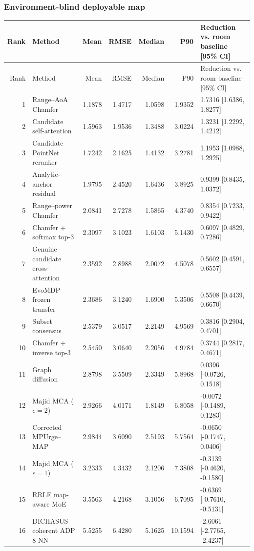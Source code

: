 \subsubsection{Environment-blind deployable map}
\begingroup\scriptsize\setlength{\tabcolsep}{3.2pt}
\begin{longtable}{@{}r p{.28\linewidth} r r r r p{.23\linewidth}@{}}
\toprule Rank & Method & Mean & RMSE & Median & P90 & Reduction vs. room baseline [95\% CI] \\
\midrule\endfirsthead
\toprule Rank & Method & Mean & RMSE & Median & P90 & Reduction vs. room baseline [95\% CI] \\
\midrule\endhead
1 & Range--AoA Chamfer & 1.1878 & 1.4717 & 1.0598 & 1.9352 & 1.7316 [1.6386, 1.8277] \\
2 & Candidate self-attention & 1.5963 & 1.9536 & 1.3488 & 3.0224 & 1.3231 [1.2292, 1.4212] \\
3 & Candidate PointNet reranker & 1.7242 & 2.1625 & 1.4132 & 3.2781 & 1.1953 [1.0988, 1.2925] \\
4 & Analytic-anchor residual & 1.9795 & 2.4520 & 1.6436 & 3.8925 & 0.9399 [0.8435, 1.0372] \\
5 & Range--power Chamfer & 2.0841 & 2.7278 & 1.5865 & 4.3740 & 0.8354 [0.7233, 0.9422] \\
6 & Chamfer + softmax top-3 & 2.3097 & 3.1023 & 1.6103 & 5.1430 & 0.6097 [0.4829, 0.7286] \\
7 & Genuine candidate cross-attention & 2.3592 & 2.8988 & 2.0072 & 4.5078 & 0.5602 [0.4591, 0.6557] \\
8 & EvoMDP frozen transfer & 2.3686 & 3.1240 & 1.6900 & 5.3506 & 0.5508 [0.4439, 0.6670] \\
9 & Subset consensus & 2.5379 & 3.0517 & 2.2149 & 4.9569 & 0.3816 [0.2904, 0.4701] \\
10 & Chamfer + inverse top-3 & 2.5450 & 3.0640 & 2.2056 & 4.9784 & 0.3744 [0.2817, 0.4671] \\
11 & Graph diffusion & 2.8798 & 3.5509 & 2.3349 & 5.8968 & 0.0396 [-0.0726, 0.1518] \\
12 & Majid MCA ($\epsilon=2$) & 2.9266 & 4.0171 & 1.8149 & 6.8058 & -0.0072 [-0.1489, 0.1283] \\
13 & Corrected MPUrge--MAP & 2.9844 & 3.6090 & 2.5193 & 5.7564 & -0.0650 [-0.1747, 0.0406] \\
14 & Majid MCA ($\epsilon=1$) & 3.2333 & 4.3432 & 2.1206 & 7.3808 & -0.3139 [-0.4620, -0.1580] \\
15 & RRLE map-aware MoE & 3.5563 & 4.2168 & 3.1056 & 6.7095 & -0.6369 [-0.7610, -0.5131] \\
16 & DICHASUS coherent ADP 8-NN & 5.5255 & 6.4280 & 5.1625 & 10.1594 & -2.6061 [-2.7765, -2.4237] \\
\bottomrule
\end{longtable}\endgroup
